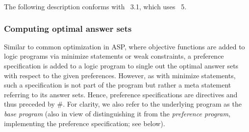 The following description conforms with \asprin~3.1, which uses \clingo~5.%

\subsubsection{Computing optimal answer sets}

Similar to common optimization in ASP,
where objective functions are added to logic programs
via minimize statements or weak constraints,
a preference specification is added to a logic program
to single out the optimal answer sets with respect to the given preferences.
However, as with minimize statements,
such a specification is not part of the program
but rather a meta statement referring to its answer sets.
Hence, preference specifications are directives and thus preceded by \#.
For clarity, we also refer to the underlying program as the \emph{base program}
(also in view of distinguishing it from the \emph{preference program},
implementing the preference specification; see below).

